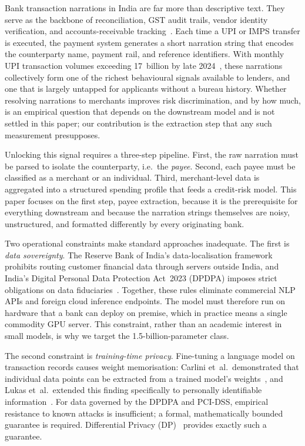 \documentclass[conference]{IEEEtran}
\begin{document}
Bank transaction narrations in India are far more than descriptive text. They serve as the backbone of reconciliation, GST audit trails, vendor identity verification, and accounts-receivable tracking~\cite{rbi2025vision}. Each time a UPI or IMPS transfer is executed, the payment system generates a short narration string that encodes the counterparty name, payment rail, and reference identifiers. With monthly UPI transaction volumes exceeding 17~billion by late 2024~\cite{rbi2025vision}, these narrations collectively form one of the richest behavioural signals available to lenders, and one that is largely untapped for applicants without a bureau history. Whether resolving narrations to merchants improves risk discrimination, and by how much, is an empirical question that depends on the downstream model and is not settled in this paper; our contribution is the extraction step that any such measurement presupposes.

Unlocking this signal requires a three-step pipeline. First, the raw narration must be parsed to isolate the counterparty, i.e.\ the \emph{payee}. Second, each payee must be classified as a merchant or an individual. Third, merchant-level data is aggregated into a structured spending profile that feeds a credit-risk model. This paper focuses on the first step, payee extraction, because it is the prerequisite for everything downstream and because the narration strings themselves are noisy, unstructured, and formatted differently by every originating bank.

Two operational constraints make standard approaches inadequate. The first is \emph{data sovereignty}. The Reserve Bank of India's data-localisation framework prohibits routing customer financial data through servers outside India, and India's Digital Personal Data Protection Act~2023 (DPDPA) imposes strict obligations on data fiduciaries~\cite{dwork2006calibrating}. Together, these rules eliminate commercial NLP APIs and foreign cloud inference endpoints. The model must therefore run on hardware that a bank can deploy on premise, which in practice means a single commodity GPU server. This constraint, rather than an academic interest in small models, is why we target the 1.5-billion-parameter class.

The second constraint is \emph{training-time privacy}. Fine-tuning a language model on transaction records causes weight memorisation: Carlini et~al.\ demonstrated that individual data points can be extracted from a trained model's weights~\cite{carlini2021extracting}, and Lukas et~al.\ extended this finding specifically to personally identifiable information~\cite{lukas2023pii}. For data governed by the DPDPA and PCI-DSS, empirical resistance to known attacks is insufficient; a formal, mathematically bounded guarantee is required. Differential Privacy (DP)~\cite{dwork2006calibrating} provides exactly such a guarantee.
\end{document}
